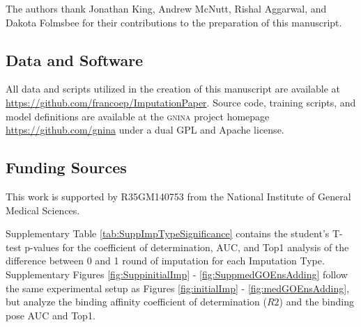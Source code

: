 \documentclass[journal=jcim,manuscript=article]{achemso}
\begin{document}
\begin{acknowledgement}

The authors thank Jonathan King, Andrew McNutt, Rishal Aggarwal, and Dakota Folmsbee for their contributions to the preparation of this manuscript.

\subsection{Data and Software}
All data and scripts utilized in the creation of this manuscript are available at \url{https://github.com/francoep/ImputationPaper}.
Source code, training scripts, and model definitions are available at the \textsc{gnina} project homepage \url{https://github.com/gnina} under a dual GPL and Apache license.

\subsection{Funding Sources}
This work is supported by R35GM140753 from the National Institute of General Medical Sciences.

\end{acknowledgement}

\begin{suppinfo}

Supplementary Table \ref{tab:SuppImpTypeSignificance} contains the student's T-test p-values for the coefficient of determination, AUC, and Top1 analysis of the difference between 0 and 1 round of imputation for each Imputation Type.
Supplementary Figures \ref{fig:SuppinitialImp} - \ref{fig:SuppmedGOEnsAdding} follow the same experimental setup as Figures \ref{fig:initialImp} - \ref{fig:medGOEnsAdding}, but analyze the binding affinity coefficient of determination ($R2$) and the binding pose AUC and Top1.

\end{suppinfo}


\end{document}
